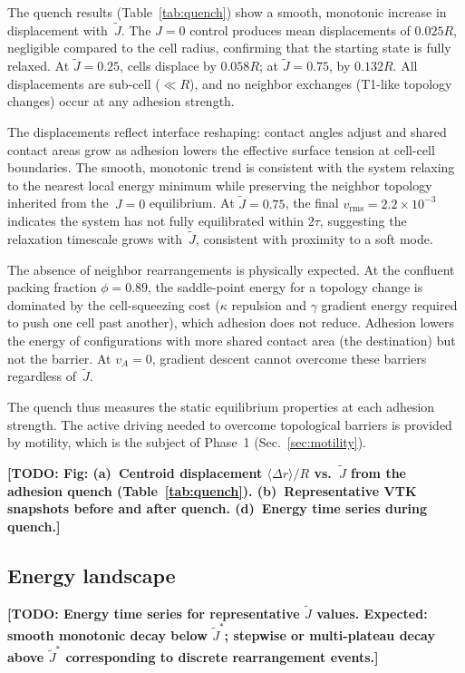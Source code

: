 \documentclass[aps,pre,twocolumn,superscriptaddress,longbibliography,floatfix]{revtex4-2}
\newcommand{\vA}{v_{\!A}}                  %
\newcommand{\Jt}{\tilde{J}}               %
\newcommand{\TODO}[1]{{\color{red}\textbf{[TODO: #1]}}}
\begin{document}
The quench results (Table~\ref{tab:quench}) show a smooth, monotonic
increase in displacement with~$\Jt$.  The $J = 0$ control produces
mean displacements of $0.025R$, negligible compared to the cell
radius, confirming that the starting state is fully relaxed.  At
$\Jt = 0.25$, cells displace by $0.058R$; at $\Jt = 0.75$, by
$0.132R$.  All displacements are sub-cell ($\ll R$), and no neighbor
exchanges (T1-like topology changes) occur at any adhesion strength.

The displacements reflect interface reshaping: contact angles adjust
and shared contact areas grow as adhesion lowers the effective surface
tension at cell-cell boundaries.  The smooth, monotonic trend is
consistent with the system relaxing to the nearest local energy
minimum while preserving the neighbor topology inherited from
the~$J = 0$ equilibrium.  At $\Jt = 0.75$, the final
$v_{\mathrm{rms}} = 2.2\times10^{-3}$ indicates the system has not
fully equilibrated within $2\tau$, suggesting the relaxation timescale
grows with~$\Jt$, consistent with proximity to a soft mode.

The absence of neighbor rearrangements is physically expected.  At the
confluent packing fraction $\phi = 0.89$, the saddle-point energy for
a topology change is dominated by the cell-squeezing cost ($\kappa$
repulsion and $\gamma$ gradient energy required to push one cell past
another), which adhesion does not reduce.  Adhesion lowers the energy
of configurations with more shared contact area (the destination) but
not the barrier.  At $\vA = 0$, gradient descent cannot overcome
these barriers regardless of~$\Jt$.

The quench thus measures the static equilibrium
properties at each adhesion strength.  The active driving needed to
overcome topological barriers is provided by motility, which is the
subject of Phase~1 (Sec.~\ref{sec:motility}).

\TODO{Fig: (a)~Centroid displacement $\langle\Delta r\rangle / R$ vs.\ $\Jt$ from
the adhesion quench (Table~\ref{tab:quench}).
(b)~Representative VTK snapshots before and after quench.
(d)~Energy time series during quench.}

\subsection{Energy landscape}
\label{sec:quench:energy}

\TODO{Energy time series for representative $\Jt$ values.  Expected:
smooth monotonic decay below $\Jt^*$; stepwise or multi-plateau decay
above $\Jt^*$ corresponding to discrete rearrangement events.}
\end{document}
